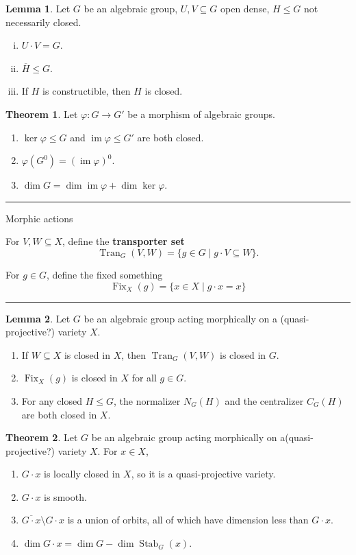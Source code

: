 \documentclass[12pt]{article}
\newcommand{\keyword}[1]{\textbf{#1}}
\newcommand{\sepline}{\rule{\textwidth}{0.4pt}}
\theoremstyle{definition}
\newtheorem{lemma}{Lemma}
\newtheorem{theorem}{Theorem}
\renewcommand{\phi}{\varphi}
\newcommand{\<}{\langle}
\renewcommand{\>}{\rangle}
\newcommand{\clo}{\overline}
\newcommand{\seq}{\subseteq}
\DeclareMathOperator{\im}{im}
\DeclareMathOperator{\Tran}{Tran}
\DeclareMathOperator{\Stab}{Stab}
\DeclareMathOperator{\Fix}{Fix}
\begin{document}
\begin{lemma}
    Let $G$ be an algebraic group, $U, V \seq G$ open dense, $H \leq G$ not necessarily closed.
    \begin{enumerate}[(i)]
        \item $U \cdot V = G$.
        \item $\clo{H} \leq G$.
        \item If $H$ is constructible, then $H$ is closed.
    \end{enumerate}
\end{lemma}

\begin{theorem}
    Let $\phi : G \to G'$ be a morphism of algebraic groups.
    \begin{enumerate}[(1)]
        \item $\ker\phi \leq G$ and $\im\phi \leq G'$ are both closed.
        \item $\phi(G^0) = (\im\phi)^0$.
        \item $\dim G = \dim\im\phi + \dim\ker\phi$.
    \end{enumerate}
\end{theorem}


\sepline

Morphic actions

For $V, W \seq X$, define the \keyword{transporter set}
\[
    \Tran_G(V, W) = \{g \in G \mid g \cdot V \seq W\}.
\]

For $g \in G$, define the fixed something
\[
    \Fix_X(g) = \{x \in X \mid g \cdot x = x\}
\]

\sepline

\begin{lemma}
    Let $G$ be an algebraic group acting morphically on a (quasi-projective?) variety $X$.
    \begin{enumerate}[(1)]
        \item If $W \seq X$ is closed in $X$, then $\Tran_G(V, W)$ is closed in $G$.
        \item $\Fix_X(g)$ is closed in $X$ for all $g \in G$.
        \item For any closed $H \leq G$, the normalizer $N_G(H)$ and the centralizer $C_G(H)$ are both closed in $X$.
    \end{enumerate}
\end{lemma}

\begin{theorem}
    Let $G$ be an algebraic group acting morphically on a(quasi-projective?) variety $X$.
    For $x \in X$,
    \begin{enumerate}[(1)]
        \item $G \cdot x$ is locally closed in $X$, so it is a quasi-projective variety.
        \item $G \cdot x$ is smooth.
        \item $\clo{G \cdot x} \setminus G \cdot x$ is a union of orbits, all of which have dimension less than $G \cdot x$.
        \item $\dim G \cdot x = \dim G - \dim\Stab_G(x)$.
    \end{enumerate}
\end{theorem}
\end{document}
